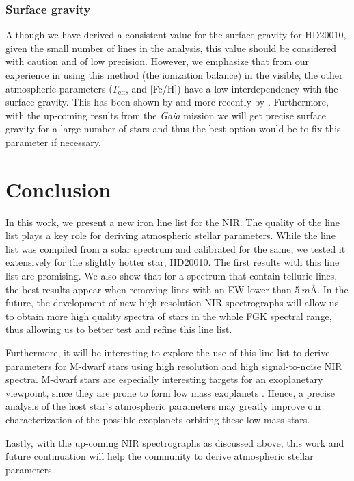 \documentclass{aa}
\begin{document}
\subsubsection{Surface gravity}
\label{subs:surface_gravity}
Although we have derived a consistent value for the surface gravity for
HD20010, given the small number of  lines in the analysis,
this value should be considered with caution and of low precision. However,
we emphasize that from our experience in using this method (the ionization
balance) in the visible, the other atmospheric parameters ($T_\mathrm{eff}$,
and [Fe/H]) have a low interdependency with the surface gravity. This has
been shown by \citet{Torres2012} and more recently by \citet{Mortier2014}.
Furthermore, with the up-coming results from the \emph{Gaia} mission we will
get precise surface gravity for a large number of stars and thus the best
option would be to fix this parameter if necessary.


\section{Conclusion}
\label{sec:conclusion}

In this work, we present a new iron line list for the NIR. The quality
of the line list plays a key role for deriving atmospheric stellar
parameters. While the line list was compiled from a solar spectrum and
calibrated for the same, we tested it extensively for the slightly
hotter star, HD20010. The first results with this line list are
promising. We also show that for a spectrum that contain telluric
lines, the best results appear when removing lines with an EW lower
than $\SI{5}{m\angstrom}$. In the future, the development of new high
resolution NIR spectrographs will allow us to obtain more high quality
spectra of stars in the whole FGK spectral range, thus allowing us to
better test and refine this line list.

Furthermore, it will be interesting to explore the use of this line list
to derive parameters for M-dwarf stars using high resolution and high
signal-to-noise NIR spectra. M-dwarf stars are especially interesting
targets for an exoplanetary viewpoint, since they are prone to form
low mass exoplanets \citep{Bonfils2013}. Hence, a precise analysis
of the host star's atmospheric parameters may greatly improve our
characterization of the possible exoplanets orbiting these low mass
stars.

Lastly, with the up-coming NIR spectrographs as discussed above,
this work and future continuation will help the community to derive
atmospheric stellar parameters.
\end{document}
